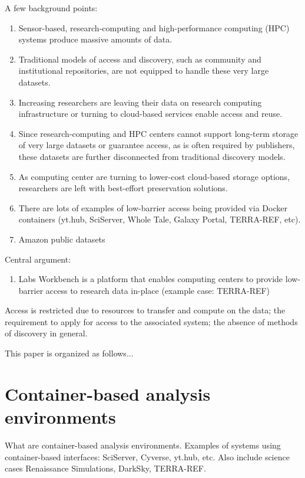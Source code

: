 \documentclass{sig-alternate}
\begin{document}
A few background points:
\begin{enumerate}
\item Sensor-based, research-computing and high-performance computing (HPC) systems produce massive amounts of data. 
\item Traditional models of access and discovery, such as community and institutional repositories, are not equipped to handle these very large datasets.  \item Increasing researchers are leaving their data on research computing infrastructure or turning to cloud-based services enable access and reuse.
\item Since research-computing and HPC centers cannot support long-term storage of very large datasets or guarantee access, as is often required by publishers, these datasets are further disconnected from traditional discovery models.
\item As computing center are turning to lower-cost cloud-based storage options, researchers are left with best-effort preservation solutions.
\item There are lots of examples of low-barrier access being provided via Docker containers (yt.hub, SciServer, Whole Tale, Galaxy Portal, TERRA-REF, etc).
\item Amazon public datasets
\end{enumerate}


Central argument:
\begin{enumerate}
\item Labs Workbench is a platform that enables computing centers to provide low-barrier access to research data in-place (example case: TERRA-REF)
\end{enumerate}


Access is restricted due to resources to transfer and compute on the data; the requirement to apply for access to the associated system; the absence of methods of discovery in general.



This paper is organized as follows...

\section{Container-based analysis environments}

What are container-based analysis environments. Examples of systems using container-based interfaces: SciServer, Cyverse, yt.hub, etc. Also include science cases Renaissance Simulations, DarkSky, TERRA-REF.
\end{document}
